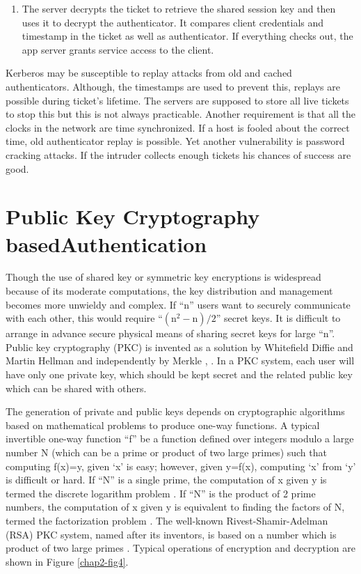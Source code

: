 \begin{multicols}{2}
\begin{enumerate}
\item The server decrypts the ticket to retrieve the shared session key and then uses it to decrypt the authenticator. It compares client credentials and timestamp in the ticket as well as authenticator. If everything checks out, the app server grants service access to the client.
\end{enumerate}

Kerberos may be susceptible to replay attacks from old and cached authenticators. Although, the timestamps are used to prevent this, replays are possible during ticket's lifetime. The servers are supposed to store all live tickets to stop this but this is not always practicable. Another requirement is that all the clocks in the network are time synchronized. If a host is fooled about the correct time, old authenticator replay is possible. Yet another vulnerability is password cracking attacks. If the intruder collects enough tickets his chances of success are good.

\section*{Public Key Cryptography based\hfil\break Authentication}

Though the use of shared key or symmetric key encryptions is widespread because of its moderate computations, the key distribution and management becomes more unwieldy and complex. If ``n'' users want to securely communicate with each other, this would require ``$(\text{n}^{2}-\text{n})/2$'' secret keys. It is difficult to arrange in advance secure physical means of sharing secret keys for large ``n''. Public key cryptography (PKC) is invented as a solution by Whitefield Diffie and Martin Hellman and independently by Merkle \cite{chap2-key1}, \cite{chap2-key13}. In a PKC system, each user will have only one private key, which should be kept secret and the related public key which can be shared with others.

The generation of private and public keys depends on cryptographic algorithms based on mathematical problems to produce one-way functions. A typical invertible one-way function ``f'' be a function defined over integers modulo a large number N (which can be a prime or product of two large primes) such that computing f(x)=y, given `x' is easy; however, given y=f(x), computing `x' from `y' is difficult or hard. If ``N'' is a single prime, the computation of x given y is termed the discrete logarithm problem \cite{chap2-key1}. If ``N'' is the product of 2 prime numbers, the computation of x given y is equivalent to finding the factors of N, termed the factorization problem \cite{chap2-key1}. The well-known Rivest-Shamir-Adelman (RSA) PKC system, named after its inventors, is based on a number which is product of two large primes \cite{chap2-key14}. Typical operations of encryption and decryption are shown in Figure \ref{chap2-fig4}. 


\end{multicols}
